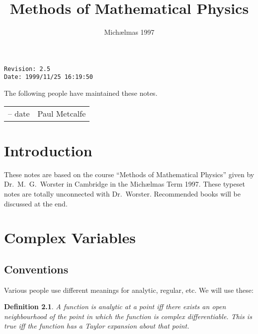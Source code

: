 \documentclass{notes}
\theoremstyle{plain}
\newtheorem*{definition}{Definition}
\begin{document}
\frontmatter

\title{Methods of Mathematical Physics}

\date{Mich\ae lmas 1997} \maketitle

\thispagestyle{empty}

\noindent\verb$Revision: 2.5 $\hfill\\
\noindent\verb$Date: 1999/11/25 16:19:50 $\hfill

\vspace{1.5in}

The following people have maintained these notes.

\begin{center}
\begin{tabular}{ r  l}
-- date & Paul Metcalfe
\end{tabular}
\end{center}

\tableofcontents
\chapter{Introduction}

These notes are based on the course ``Methods of Mathematical
Physics'' given by Dr.~M.~G.~Worster in Cambridge in the Mich\ae lmas
Term 1997.  These typeset notes are totally unconnected with
Dr.~Worster.  Recommended books will be discussed at the end.

\alsoavailable
\archimcopyright

\mainmatter

\chapter{Complex Variables}

\section{Conventions}

Various people use different meanings for analytic, regular, etc.  We
will use these:

\begin{definition}
A function is \emph{analytic} at a point iff there exists an open
neighbourhood of the point in which the function is complex differentiable.
This is true iff the function has a Taylor expansion about that point.
\end{definition}
\end{document}
